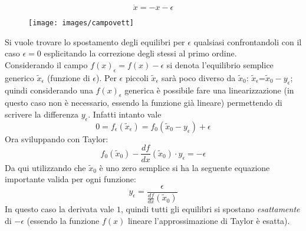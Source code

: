 \documentclass[Main.tex]{subfiles}
\begin{document}
\newpage
\begin{appendic}[Retta]
\begin{equation}
  \dot x = - x - \epsilon
\end{equation}

\begin{figure}[H]
    \centering
  \texttt{[image: images/campovett]}
\end{figure}

Si vuole trovare lo spostamento degli equilibri per $\epsilon$ qualsiasi confrontandoli con il caso $\epsilon=0$ esplicitando la correzione degli stessi al primo ordine.\\
Considerando il campo $f(x)_\epsilon= f(x) - \epsilon$ si denota l'equilibrio semplice generico $\tilde x_\epsilon$ (funzione di $\epsilon$). Per $\epsilon$ piccoli $\tilde x_\epsilon$ sarà poco diverso da $\tilde x _0$: $\tilde x_\epsilon$=$\tilde x_0-y_\epsilon$; quindi considerando una $f(x)_\epsilon$ generica è possibile fare una linearizzazione (in questo caso non è necessario, essendo la funzione già lineare) permettendo di scrivere la differenza $y_\epsilon$. Infatti intanto vale
\begin{equation}
  0=f_\epsilon(\tilde x_\epsilon)=f_0(\tilde x_0-y_\epsilon)+\epsilon
\end{equation}
Ora sviluppando con Taylor:
\begin{equation}
  f_0(\tilde x_0)-\frac{d f}{dx}(\tilde x_0) \cdot y_\epsilon=-\epsilon
\end{equation}
Da qui utilizzando che $\tilde x_0$ è uno zero semplice si ha la seguente equazione importante valida per ogni funzione:
\begin{equation}
  y_\epsilon=\frac{\epsilon}{\frac{d f}{dx}(\tilde x_0)}
\end{equation}
In questo caso la derivata vale $1$, quindi tutti gli equilibri si spostano \textit{esattamente} di $-\epsilon$ (essendo la funzione $f(x)$ lineare l'approssimazione di Taylor è esatta).
\end{appendic}
\end{document}
